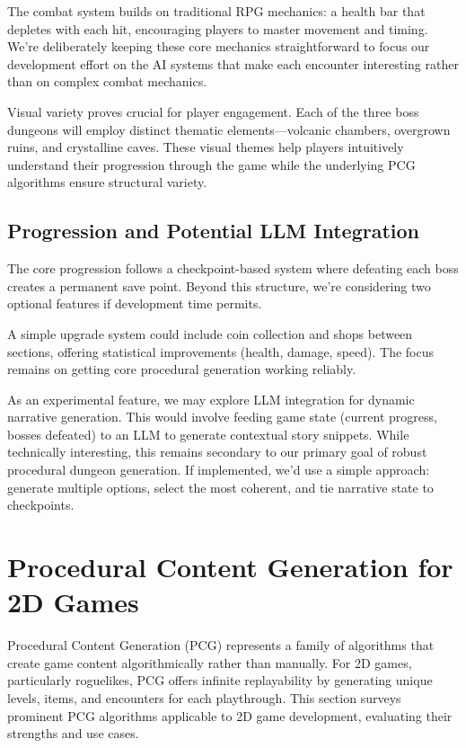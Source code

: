 \documentclass[11pt]{article}
\begin{document}
The combat system builds on traditional RPG mechanics: a health bar that depletes with each hit, encouraging players to master movement and timing. We're deliberately keeping these core mechanics straightforward to focus our development effort on the AI systems that make each encounter interesting rather than on complex combat mechanics.

Visual variety proves crucial for player engagement. Each of the three boss dungeons will employ distinct thematic elements—volcanic chambers, overgrown ruins, and crystalline caves. These visual themes help players intuitively understand their progression through the game while the underlying PCG algorithms ensure structural variety.

\subsection{Progression and Potential LLM Integration}

The core progression follows a checkpoint-based system where defeating each boss creates a permanent save point. Beyond this structure, we're considering two optional features if development time permits.

A simple upgrade system could include coin collection and shops between sections, offering statistical improvements (health, damage, speed). The focus remains on getting core procedural generation working reliably.

As an experimental feature, we may explore LLM integration for dynamic narrative generation. This would involve feeding game state (current progress, bosses defeated) to an LLM to generate contextual story snippets. While technically interesting, this remains secondary to our primary goal of robust procedural dungeon generation. If implemented, we'd use a simple approach: generate multiple options, select the most coherent, and tie narrative state to checkpoints.

\section{Procedural Content Generation for 2D Games}
\label{sec:ai_techniques}

Procedural Content Generation (PCG) represents a family of algorithms that create game content algorithmically rather than manually. For 2D games, particularly roguelikes, PCG offers infinite replayability by generating unique levels, items, and encounters for each playthrough. This section surveys prominent PCG algorithms applicable to 2D game development, evaluating their strengths and use cases.
\end{document}
